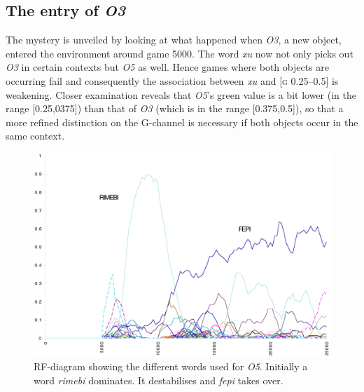 \subsection{The entry of \emph{O3}}

The mystery is unveiled by looking at what
happened when \emph{O3}, a new object, entered the environment 
around game 5000. The word \textit{xu} now not only picks out
\emph{O3} in certain contexts but \emph{O5} as well. Hence 
games where both objects are occurring fail and consequently 
the association between \textit{xu} and [\textsc{g} 0.25–0.5] is 
weakening. Closer examination reveals that \emph{O5}'s green value
is a bit lower (in the range [0.25,0375]) than that of \emph{O3}
(which is in the range [0.375,0.5]), so that a more refined
distinction on the G-channel is necessary if both objects
occur in the same context. 


\begin{figure}[htbp]
  \centerline{\includegraphics[width=.80\textwidth]{chap7/figs/RF-O5.pdf}}
\caption{\label{RF-O5}RF-diagram showing
the different words used for \emph{O5}. Initially a word 
\textit{rimebi} dominates. It destabilises and \textit{fepi} takes over.}
\end{figure}

